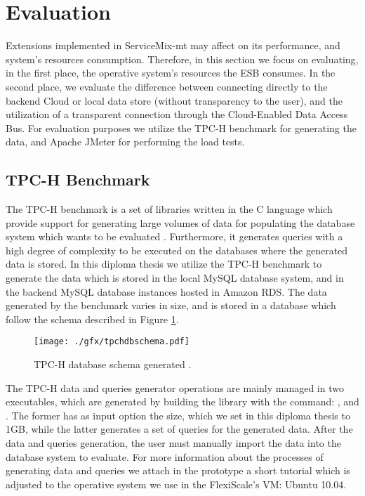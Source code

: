 \section{Evaluation}
\label{sec:evaluation}

Extensions implemented in ServiceMix-mt may affect on its performance, and system's resources consumption. Therefore, in this section we focus on evaluating, in the first place, the operative system's resources the \ac{ESB} consumes. In the second place, we evaluate the difference between connecting directly to the backend Cloud or local data store (without transparency to the user), and the utilization of a transparent connection through the Cloud-Enabled Data Access Bus. For evaluation purposes we utilize the TPC-H benchmark for generating the data, and Apache JMeter for performing the load tests. 

\subsection{TPC-H Benchmark}

The TPC-H benchmark is a set of libraries written in the C language which provide support for generating large volumes of data for populating the database system which wants to be evaluated \cite{tcpbenchmark}. Furthermore, it generates queries with a high degree of complexity to be executed on the databases where the generated data is stored. In this diploma thesis we utilize the TPC-H benchmark to generate the data which is stored in the local MySQL database system, and in the backend MySQL database instances hosted in Amazon RDS. The data generated by the benchmark varies in size, and is stored in a database which follow the schema described in Figure \ref{fig:tpchschema}. 

\begin{figure}[htb]
	\centering
		\texttt{[image: ./gfx/tpchdbschema.pdf]}
	\caption[TPC-H Database Schema]{TPC-H database schema generated \cite{tcpbenchmark}.}
	\label{fig:tpchschema}
\end{figure}

The TPC-H data and queries generator operations are mainly managed in two executables, which are generated by building the library with the  command: , and . The former has as input option the size, which we set in this diploma thesis to 1GB, while the latter generates a set of queries for the generated data. After the data and queries generation, the user must manually import the data into the database system to evaluate. For more information about the processes of generating data and queries we attach in the prototype a short tutorial which is adjusted to the operative system we use in the FlexiScale's VM: Ubuntu 10.04.


